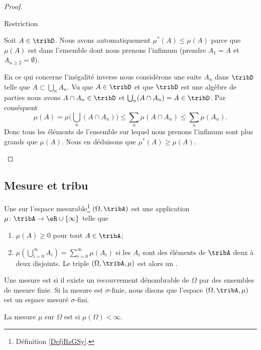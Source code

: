\begin{proof}
\begin{subproof}
    \item[Restriction]

        Soit \( A\in\tribD\). Nous avons automatiquement \( \mu^*(A)\leq \mu(A)\) parce que \( \mu(A)\) est dans l'ensemble dont nous prenons l'infimum (prendre \( A_1=A\) et \( A_{n\geq 2}=\emptyset\)).

        En ce qui concerne l'inégalité inverse nous considérons une suite \( A_n\) dans \( \tribD\) telle que \( A\subset\bigcup_nA_n\). Vu que \( A\in\tribD\) et que \( \tribD\) est une algèbre de parties nous avons \( A\cap A_n\in \tribD\) et \( \bigcup_n(A\cap A_n)=A\in\tribD\). Par conséquent
        \begin{equation}
            \mu(A)=\mu\big( \bigcup_n(A\cap A_n) \big)\leq \sum_n\mu(A\cap A_n)\leq \sum_n\mu(A_n).
        \end{equation}
        Donc tous les éléments de l'ensemble sur lequel nous prenons l'infimum sont plus grands que \( \mu(A)\). Nous en déduisons que \( \mu^*(A)\geq \mu(A)\).

    \end{subproof}
\end{proof}

\subsection{Mesure et tribu}

\begin{definition}[Mesure]  \label{DefBTsgznn}
    Une  sur l'espace mesurable\footnote{Définition \ref{DefjRsGSy}.} \( (\Omega,\tribA)\) est une application \( \mu\colon \tribA\to \eR\cup\{ \infty \}\) telle que
    \begin{enumerate}
        \item
            \( \mu(A)\geq 0\) pour tout \( A\in\tribA\);
        \item   \label{ItemQFjtOjXiii}
            \( \mu\left( \bigcup_{i=0}^{\infty}A_i\right)=\sum_{i=0}^{\infty}\mu(A_i)\) si les \( A_i\) sont des éléments de \( \tribA\) deux à deux disjoints. Le triple \( (\Omega,\tribA,\mu)\) est alors un .
    \end{enumerate}
    Une mesure est  si il existe un recouvrement dénombrable de \( \Omega\) par des ensembles de mesure finie. Si la mesure est $\sigma$-finie, nous disons que l'espace \( (\Omega,\tribA,\mu)\) est un espace mesuré $\sigma$-fini.

    La mesure \( \mu\) sur \( \Omega\) est  si \( \mu(\Omega)<\infty\).
\end{definition}

